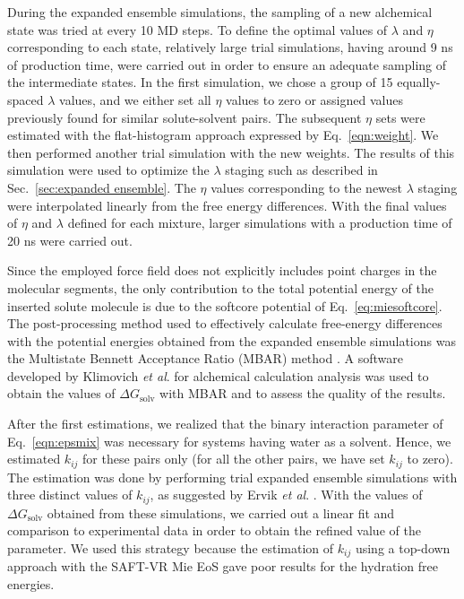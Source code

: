 \documentclass[preprint]{elsarticle}
\begin{document}
	During the expanded ensemble simulations, the sampling of a new alchemical state was tried at every 10 MD steps. To define the optimal values of $\lambda$ and $\eta$ corresponding to each state, relatively large trial simulations, having around 9 ns of production time, were carried out in order to ensure an adequate sampling of the intermediate states. In the first simulation, we chose a group of 15 equally-spaced $\lambda$ values, and we either set all $\eta$ values to zero or assigned values previously found for similar solute-solvent pairs. The subsequent $\eta$ sets were estimated with the flat-histogram approach expressed by Eq.~\eqref{eqn:weight}. We then performed another trial simulation with the new weights. The results of this simulation were used to optimize the $\lambda$ staging such as described in Sec.~\ref{sec:expanded ensemble}. The $\eta$ values corresponding to the newest $\lambda$ staging were interpolated linearly from the free energy differences. With the final values of $\eta$ and $\lambda$ defined for each mixture, larger simulations with a production time of 20 ns were carried out.
	
	Since the employed force field does not explicitly includes point charges in the molecular segments, the only contribution to the total potential energy of the inserted solute molecule is due to the softcore potential of Eq.~\eqref{eq:miesoftcore}. The post-processing method used to effectively calculate free-energy differences with the potential energies obtained from the expanded ensemble simulations was the Multistate Bennett Acceptance Ratio (MBAR) method \cite{mbar}. A software developed by Klimovich \textit{et al}. \cite{klimovich} for alchemical calculation analysis was used to obtain the values of $\Delta G_\text{solv}$ with MBAR and to assess the quality of the results.
	
	After the first estimations, we realized that the binary interaction parameter of Eq.~\eqref{eqn:epsmix} was necessary for systems having water as a solvent. Hence, we estimated $k_{ij}$ for these pairs only (for all the other pairs, we have set $k_{ij}$ to zero). The estimation was done by performing trial expanded ensemble simulations with three distinct values of $k_{ij}$, as suggested by Ervik \textit{et al}. \cite{ervik20162}. With the values of $\Delta G_\text{solv}$ obtained from these simulations, we carried out a linear fit and comparison to experimental data \cite{P29900000291, doi:10.1021/ct050097l} in order to obtain the refined value of the parameter. We used this strategy because the estimation of $k_{ij}$ using a top-down approach with the SAFT-VR Mie EoS gave poor results for the hydration free energies.
	
\end{document}
